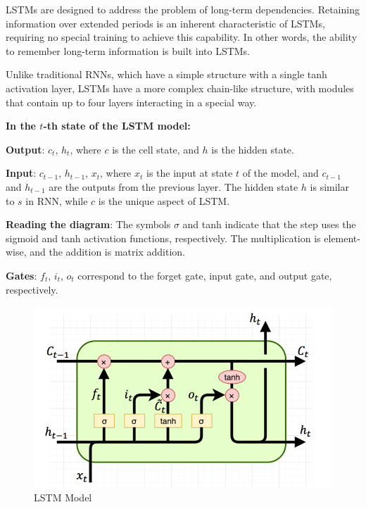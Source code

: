 \documentclass{ieeeojies}
\begin{document}
  LSTMs are designed to address the problem of long-term dependencies. Retaining information over extended periods is an inherent characteristic of LSTMs, requiring no special training to achieve this capability. In other words, the ability to remember long-term information is built into LSTMs.

  Unlike traditional RNNs, which have a simple structure with a single tanh activation layer, LSTMs have a more complex chain-like structure, with modules that contain up to four layers interacting in a special way.

  \noindent 
  \textbf{In the \(t\)-th state of the LSTM model:}

\textbf{Output}: \(c_t\), \(h_t\), where \(c\) is the cell state, and \(h\) is the hidden state.

\textbf{Input}: \(c_{t-1}\), \(h_{t-1}\), \(x_t\), where \(x_t\) is the input at state \(t\) of the model, and \(c_{t-1}\) and \(h_{t-1}\) are the outputs from the previous layer. The hidden state \(h\) is similar to \(s\) in RNN, while \(c\) is the unique aspect of LSTM.

\textbf{Reading the diagram}: The symbols \(\sigma\) and tanh indicate that the step uses the sigmoid and tanh activation functions, respectively. The multiplication is element-wise, and the addition is matrix addition.

\textbf{Gates}: \(f_t\), \(i_t\), \(o_t\) correspond to the forget gate, input gate, and output gate, respectively.

\begin{figure}[H]
  \centering
  \begin{minipage}{0.5\textwidth}
    \centering
    \includegraphics[width=\textwidth]{bibliography/Figure/LSTM Model.png}
    \caption{LSTM Model}
    \label{fig:1}
  \end{minipage}
\end{figure}
\end{document}
